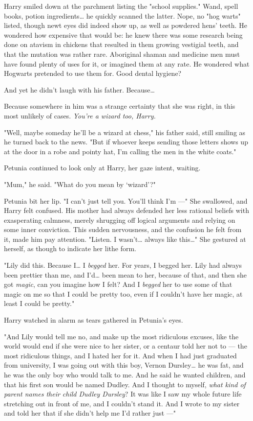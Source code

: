 Harry smiled down at the parchment listing the "school
supplies." Wand, spell books, potion ingredients{\ldots} he quickly
scanned the latter. Nope, no "hog warts" listed, though
newt eyes did indeed show up, as well as powdered hens'
teeth. He wondered how expensive that would be: he
knew there was some research being done on atavism in
chickens that resulted in them growing vestigial teeth, and
that the mutation was rather rare. Aboriginal shaman and
medicine men must have found plenty of uses for it, or
imagined them at any rate. He wondered what Hogwarts
pretended to use them for. Good dental hygiene?

And yet he didn't laugh with his father. Because{\ldots}

Because somewhere in him was a strange certainty that
she was right, in this most unlikely of cases.
\emph{You're a wizard too, Harry.}

"Well, maybe someday he'll be a wizard at chess," his
father said, still smiling as he turned back to the news.
"But if whoever keeps sending those letters shows up at
the door in a robe and pointy hat, I'm calling the men in
the white coats."

Petunia continued to look only at Harry, her gaze intent,
waiting.

"Mum," he said. "What do you mean by `wizard'?"

Petunia bit her lip. "I can't just tell you. You'll think I'm ---"
She swallowed, and Harry felt confused. His mother had
always defended her less rational beliefs with
exasperating calmness, merely shrugging off logical arguments
and relying on some inner conviction. This sudden
nervousness, and the confusion he felt from it, made him
pay attention. "Listen. I wasn't{\ldots} always like this{\ldots}" She
gestured at herself, as though to indicate her lithe form.

"Lily did this. Because I{\ldots} I \emph{begged} her. For years, I
begged her. Lily had always been prettier than me, and
I'd{\ldots} been mean to her, because of that, and then she
got \emph{magic}, can you imagine how I felt? And I \emph{begged} her
to use some of that magic on me so that I could be
pretty too, even if I couldn't have her magic, at least I
could be pretty."

Harry watched in alarm as tears gathered in Petunia's eyes.

"And Lily would tell me no, and make up the most
ridiculous excuses, like the world would end if she were
nice to her sister, or a centaur told her not to --- the most
ridiculous things, and I hated her for it. And when I had
just graduated from university, I was going out with this
boy, Vernon Dursley{\ldots} he was fat, and he was the only boy
who would talk to me. And he said he wanted children,
and that his first son would be named Dudley. And I
thought to myself, \emph{what kind of parent names their child
Dudley Dursley}? It was like I saw my whole future life
stretching out in front of me, and I couldn't stand it. And
I wrote to my sister and told her that if she didn't help
me I'd rather just ---"

